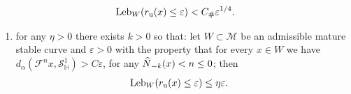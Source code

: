 \documentclass[AHL, Unicode, longabstracts,published]{cedram}
\newcommand{\eps}{\varepsilon}
\newcommand{\unstable}{\text{u}}
\newcommand{\homo}{\mathbb{H}}
\newcommand{\cm}{\mathcal{F}}
\newcommand{\csp}{\mathcal{M}}
\newcommand{\ru}{r_{\unstable}}
\newcommand{\singPrivate}{\mathcal{S}}
\newcommand{\hsing}[1]{{\singPrivate}_\homo^{#1}}
\newcommand{\admiss}{admissible}
\newcommand{\Np}{\hat N}
\newcommand{\Leb}{\textup{Leb}}
\newcommand{\Const}{C_\#}
\newcommand*{\relabel}{\renewcommand{\labelenumi}{(\theenumi)}}
\newcommand*{\alphenumi}{\renewcommand*{\theenumi}{\alph{enumi}}\relabel}
\let\oldhat\hat
\renewcommand*{\hat}[1]{\mathchoice{\widehat{#1}}{\widehat{#1}}{\oldhat{#1}}{\oldhat{#1}}}
\begin{document}
\begin{coro}
\begin{enumerate}
\begin{align*}
\Leb_{W}(\ru(x)\le\eps) < \Const \eps^{1/4}.
\end{align*}
\end{enumerate}
\begin{enumerate}\alphenumi
\setcounter{enumi}{3}
\item \label{coro7.10.d} for any $\eta > 0$ there exists $k > 0$ so that: let $W\subset\csp$ be an \admiss{} mature stable curve and $\eps > 0$ with the property that for every $x\in W$ we have $d_{\alpha}(\cm^{n}x,\hsing{1}) > C \eps$, for any $\Np_{-k}(x) < n \le 0$; then
\begin{align*}
\Leb_W(\ru(x)\leq \eps)&\leq\eta \eps.
\end{align*}
\end{enumerate}
\end{coro}
\end{document}
